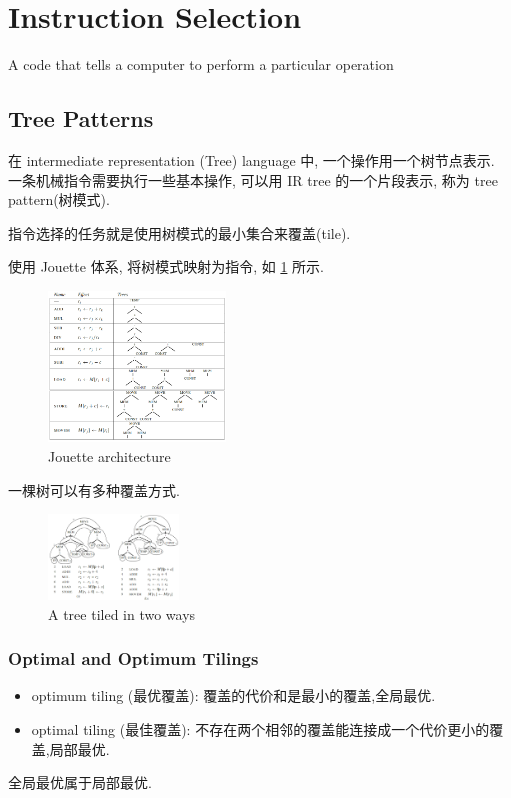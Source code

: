 \newpage
\section{Instruction Selection}
\begin{definition}
    A code that tells a computer to perform a particular operation
\end{definition}
\subsection{Tree Patterns}
在 intermediate representation (Tree) language 中, 一个操作用一个树节点表示. 一条机械指令需要执行一些基本操作, 可以用 IR tree 的一个片段表示, 称为 tree pattern(树模式).

指令选择的任务就是使用树模式的最小集合来覆盖(tile).

使用 Jouette 体系, 将树模式映射为指令, 如 \ref{fig:Jouette} 所示.

\begin{figure}[!htb]
    \centering
    \includegraphics[width=0.42\textwidth]{pic/CP9/Jouette architecture}
    \caption{Jouette architecture}
    \label{fig:Jouette}
\end{figure}

一棵树可以有多种覆盖方式.
\begin{figure}[!htb]
    \centering
    \includegraphics[width=0.309\textwidth]{pic/CP9/A tree tiled in two ways}
    \caption{A tree tiled in two ways}
\end{figure}

\subsubsection{Optimal and Optimum Tilings}
\begin{itemize}
    \item optimum tiling (最优覆盖): 覆盖的代价和是最小的覆盖,全局最优.
    \item optimal tiling (最佳覆盖): 不存在两个相邻的覆盖能连接成一个代价更小的覆盖,局部最优.
\end{itemize}
全局最优属于局部最优.


